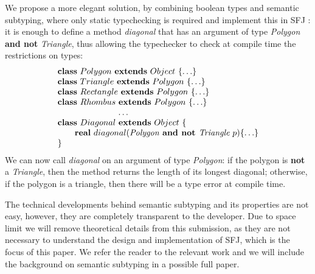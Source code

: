 \documentclass[runningheads]{llncs}
\begin{document}
\begin{example}[Polygons]
We propose a more elegant solution, by combining boolean types and semantic subtyping, where only static typechecking is required and implement this in SFJ \cite{UD20}: it is enough to define a method \emph{diagonal} that has an argument of type \emph{Polygon} \textbf{and not} \emph{Triangle}, thus allowing the typechecker to check at compile time the restrictions on types:
$$
\begin{array}{l}
\mathbf{class} \  Polygon \ \mathbf{extends }\  Object\ \{\ldots\}
\\
\mathbf{class} \  Triangle \ \mathbf{extends }\  Polygon\ \{\ldots\}
\\
\mathbf{class} \  Rectangle \ \mathbf{extends }\  Polygon\ \{\ldots\}
\\
\mathbf{class} \  Rhombus \ \mathbf{extends }\  Polygon\ \{\ldots\}
\\
\hspace{2.5cm} \ldots
\\
\mathbf{class} \  Diagonal \ \mathbf{extends }\  Object\ \{
	\\
	\qquad \mathbf{real}\ diagonal(\textit{Polygon} \textbf{ and not }  \textit{Triangle} \ p)\{\ldots\}
	\\
\}
\end{array}
$$
We can now call \emph{diagonal} on an argument of type \emph{Polygon}: if the polygon is \textbf{not} a \emph{Triangle}, then the method returns the length of its longest diagonal; otherwise, if the polygon is a triangle, then there will be a type error at compile time.
\end{example}

The technical developments behind semantic subtyping and its properties are not easy, however, they are completely transparent to the developer.
Due to space limit we will remove theoretical details from this submission, as they are not necessary to understand the design and implementation of SFJ, which is the focus of this paper. We refer the reader to the relevant work \cite{Dardha2013,Dardha2017} and we will include the background on semantic subtyping in a possible full paper.
\end{document}
